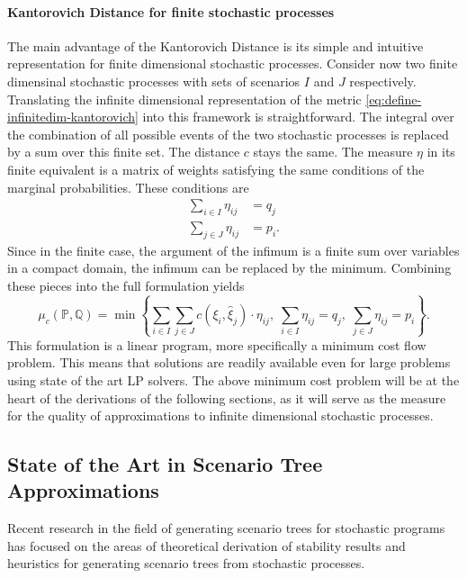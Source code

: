 \documentclass[a4paper, 12pt] {article}
\begin{document}
\paragraph{Kantorovich Distance for finite stochastic processes}
The main advantage of the Kantorovich Distance is its simple and intuitive representation for finite dimensional stochastic processes.
Consider now two finite dimensinal stochastic processes with sets of scenarios $I$ and $J$ respectively.
Translating the infinite dimensional representation of the metric \ref{eq:define-infinitedim-kantorovich} into this framework is straightforward.
The integral over the combination of all possible events of the two stochastic processes is replaced by a sum over this finite set.
The distance $c$ stays the same.
The measure $\eta$ in its finite equivalent is a matrix of weights satisfying the same conditions of the marginal probabilities.
These conditions are
\begin{align}
  \label{eq:finitedim-marginals-eta}
  \sum_{i\in I} \eta_{ij} &= q_j\\
  \sum_{j\in J} \eta_{ij} &= p_i.
\end{align}
Since in the finite case, the argument of the infimum is a finite sum over variables in a compact domain, the infimum can be replaced by the minimum. Combining these pieces into the full formulation yields
\begin{equation}
  \label{eq:define-finitedim-Kantorovich}
  \mu_c(\mathbb{P}, \mathbb{Q}) = \min\left\{\sum_{i\in I}\sum_{j\in J}c(\xi_i,\hat{\xi}_j)\cdot \eta_{ij},\; \sum_{i\in I}\eta_{ij}=q_j,\;\sum_{j\in J}\eta_{ij}=p_i\right\}.
\end{equation}
This formulation is a linear program, more specifically a minimum cost flow problem. This means that solutions are readily available even for large problems using state of the art LP solvers. The above minimum cost problem will be at the heart of the derivations of the following sections, as it will serve as the measure for the quality of approximations to infinite dimensional stochastic processes.
\subsection{State of the Art in Scenario Tree Approximations}
Recent research in the field of generating scenario trees for stochastic programs has focused on the areas of theoretical derivation of stability results and heuristics for generating scenario trees from stochastic processes. 
\end{document}
